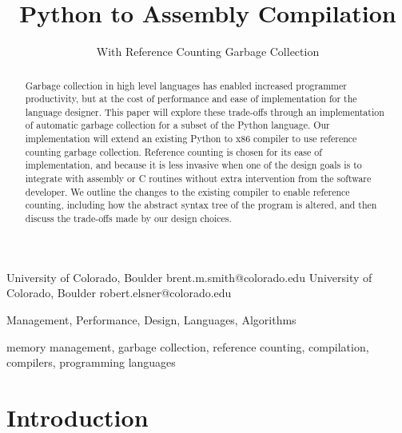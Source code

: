 \documentclass{sigplanconf}
\begin{document}
\copyrightdata{[to be supplied]} 


\title{Python to Assembly Compilation}
\subtitle{With Reference Counting Garbage Collection}

           {University of Colorado, Boulder}
           {brent.m.smith@colorado.edu}
           {University of Colorado, Boulder}
           {robert.elsner@colorado.edu}

\maketitle

\begin{abstract}
Garbage collection in high level languages has enabled increased programmer productivity, but at the cost of performance and ease of implementation for the language designer.  This paper will explore these trade-offs through an implementation of automatic garbage collection for a subset of the Python language.   Our implementation will extend an existing Python to x86 compiler to use reference counting garbage collection.  Reference counting is chosen for its ease of implementation, and because it is less invasive when one of the design goals is to integrate with assembly or C routines without extra intervention from the software developer.  We outline the changes to the existing compiler to enable reference counting, including how the abstract syntax tree of the program is altered, and then discuss the trade-offs made by our design choices.
\end{abstract}


\terms
Management, Performance, Design, Languages, Algorithms

\keywords
memory management, garbage collection, reference counting, compilation, compilers, programming languages

\section{Introduction}
\end{document}

